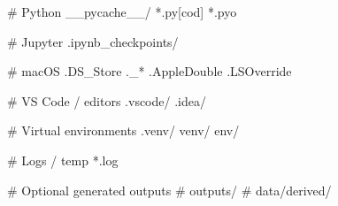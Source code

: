 # Python
__pycache__/
*.py[cod]
*.pyo

# Jupyter
.ipynb_checkpoints/

# macOS
.DS_Store
._*
.AppleDouble
.LSOverride

# VS Code / editors
.vscode/
.idea/

# Virtual environments
.venv/
venv/
env/

# Logs / temp
*.log

# Optional generated outputs
# outputs/
# data/derived/